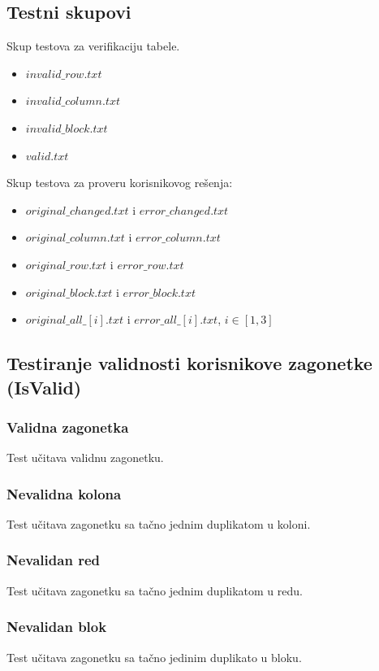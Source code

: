 \documentclass[a4paper]{article}
\begin{document}
    \subsection{Testni skupovi}
    {\parindent0pt
        Skup testova za verifikaciju tabele.
        \begin{itemize}
            \item $invalid\_row.txt$
            \item $invalid\_column.txt$
            \item $invalid\_block.txt$
            \item $valid.txt$
        \end{itemize}
        \par Skup testova za proveru korisnikovog rešenja:
        \begin{itemize}
            \item $original\_changed.txt$ i $error\_changed.txt$
            \item $original\_column.txt$ i $error\_column.txt$
            \item $original\_row.txt$ i $error\_row.txt$
            \item $original\_block.txt$ i $error\_block.txt$
            \item $original\_all\_[i].txt$ i $error\_all\_[i].txt$, $i\in[1,3]$
        \end{itemize}    
    }
    \subsection{Testiranje validnosti korisnikove zagonetke (IsValid)}
    \subsubsection{Validna zagonetka}
    Test učitava validnu zagonetku.
    \subsubsection{Nevalidna kolona}
    Test učitava zagonetku sa tačno jednim duplikatom u koloni. 
    \subsubsection{Nevalidan red}
    Test učitava zagonetku sa tačno jednim duplikatom u redu.
    \subsubsection{Nevalidan blok}
    Test učitava zagonetku sa tačno jedinim duplikato u bloku.
\end{document}
